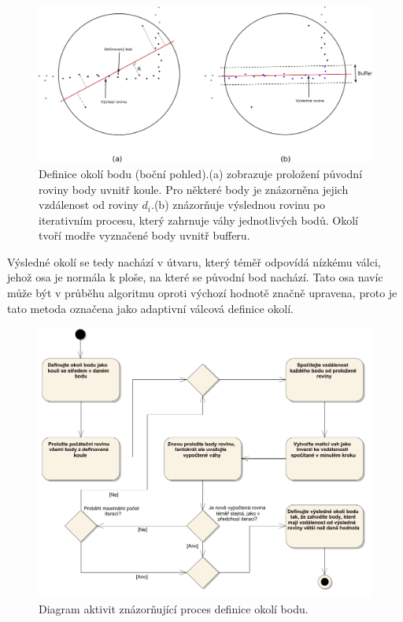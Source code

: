\documentclass[11pt,twoside,a4paper]{book}
\begin{document}
\begin{figure}[ht]
\begin{center}
\includegraphics[width=\textwidth]{figures/definice-okoli}
\caption{Definice okolí bodu (boční pohled).\newline (a) zobrazuje proložení původní roviny body uvnitř koule. Pro některé body je znázorněna jejich vzdálenost od roviny $d_i$.\newline (b) znázorňuje výslednou rovinu po iterativním procesu, který zahrnuje váhy jednotlivých bodů. Okolí tvoří modře vyznačené body uvnitř bufferu.}
\label{fig:definice-okoli}
\end{center}
\end{figure}

Výsledné okolí se tedy nachází v útvaru, který téměř odpovídá nízkému válci, jehož osa je normála k ploše, na které se původní bod nachází. Tato osa navíc může být v průběhu algoritmu oproti výchozí hodnotě značně upravena, proto je tato metoda označena jako adaptivní válcová definice okolí. 

\begin{figure}[ht]
\begin{center}
\includegraphics[width=\textwidth]{figures/okoli-diagram}
\caption{Diagram aktivit znázorňující proces definice okolí bodu.}
\label{fig:diagram-okoli}
\end{center}
\end{figure}
\end{document}
